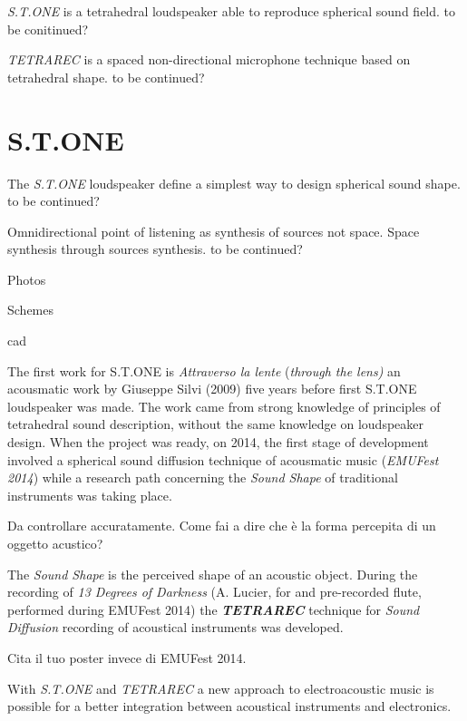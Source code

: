 \documentclass{article}
\begin{document}
\emph{S.T.ONE} is a tetrahedral loudspeaker able to reproduce spherical sound field. to be conitinued?

\emph{TETRAREC} is a spaced non-directional microphone technique based on tetrahedral shape. to be continued?


\section{S.T.ONE}
\label{sec:stone}

The \emph{S.T.ONE} loudspeaker define a simplest way to design spherical sound shape. to be continued?

Omnidirectional point of listening as synthesis of sources not space.
Space synthesis through sources synthesis. to be continued?

Photos

Schemes

cad

The first work for S.T.ONE is \emph{Attraverso la lente} (\emph{through the lens)}
an acousmatic work by Giuseppe Silvi (2009) five years before first S.T.ONE loudspeaker
was made. The work came from strong knowledge of principles of tetrahedral sound description,
without the same knowledge on loudspeaker design. When the project was ready, on 2014,
the first stage of development involved a spherical sound diffusion technique of acousmatic
music (\emph{EMUFest 2014}) while a research path concerning the \emph{Sound Shape} of
traditional instruments was taking place.

Da controllare accuratamente. Come fai a dire che \`e la forma percepita di un oggetto acustico? 

The \emph{Sound Shape} is the perceived shape of an acoustic object. During  the recording of
\emph{13 Degrees of Darkness} (A. Lucier, for and pre-recorded flute, performed during
EMUFest 2014) the \emph{\textbf{TETRAREC}} technique for \emph{Sound Diffusion} recording
of acoustical instruments was developed.

Cita il tuo poster invece di EMUFest 2014.

With \emph{S.T.ONE} and \emph{TETRAREC} a new approach to electroacoustic music is possible
for a better integration between acoustical instruments and electronics.
\end{document}
